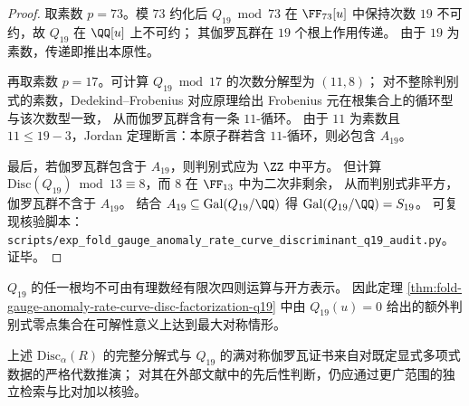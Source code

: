 \begin{proof}
取素数 \(p=73\)。模 \(73\) 约化后 \(Q_{19}\bmod 73\) 在 \(\FF_{73}[u]\) 中保持次数 \(19\) 不可约，故 \(Q_{19}\) 在 \(\QQ[u]\) 上不可约；
其伽罗瓦群在 \(19\) 个根上作用传递。
由于 \(19\) 为素数，传递即推出本原性。
\par
再取素数 \(p=17\)。可计算 \(Q_{19}\bmod 17\) 的次数分解型为 \((11,8)\)；
对不整除判别式的素数，Dedekind--Frobenius 对应原理给出 Frobenius 元在根集合上的循环型与该次数型一致，
从而伽罗瓦群含有一条 \(11\)-循环。
由于 \(11\) 为素数且 \(11\le 19-3\)，Jordan 定理断言：本原子群若含 \(11\)-循环，则必包含 \(A_{19}\)。
\par
最后，若伽罗瓦群包含于 \(A_{19}\)，则判别式应为 \(\ZZ\) 中平方。
但计算 \(\mathrm{Disc}(Q_{19})\bmod 13\equiv 8\)，而 \(8\) 在 \(\FF_{13}\) 中为二次非剩余，
从而判别式非平方，伽罗瓦群不含于 \(A_{19}\)。
结合 \(A_{19}\subseteq \mathrm{Gal}(Q_{19}/\QQ)\) 得
\(\mathrm{Gal}(Q_{19}/\QQ)=S_{19}\)。
可复现核验脚本：\texttt{scripts/exp\_fold\_gauge\_anomaly\_rate\_curve\_discriminant\_q19\_audit.py}。证毕。
\end{proof}

\begin{corollary}[根的不可根式性]\label{cor:fold-gauge-anomaly-q19-nonradical}
\(Q_{19}\) 的任一根均不可由有理数经有限次四则运算与开方表示。
因此定理 \ref{thm:fold-gauge-anomaly-rate-curve-disc-factorization-q19} 中由 \(Q_{19}(u)=0\) 给出的额外判别式零点集合在可解性意义上达到最大对称情形。
\end{corollary}

\begin{remark}[外部新颖性核验的边界]\label{rem:fold-gauge-anomaly-q19-novelty-boundary}
上述 \(\mathrm{Disc}_{\alpha}(R)\) 的完整分解式与 \(Q_{19}\) 的满对称伽罗瓦证书来自对既定显式多项式数据的严格代数推演；
对其在外部文献中的先后性判断，仍应通过更广范围的独立检索与比对加以核验。
\end{remark}

\endinput

